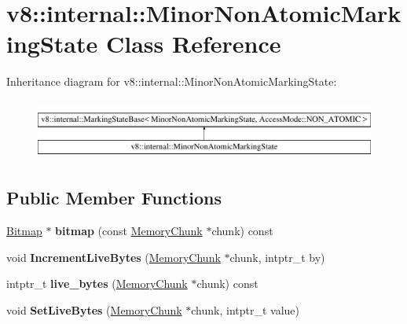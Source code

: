 \hypertarget{classv8_1_1internal_1_1MinorNonAtomicMarkingState}{}\section{v8\+:\+:internal\+:\+:Minor\+Non\+Atomic\+Marking\+State Class Reference}
\label{classv8_1_1internal_1_1MinorNonAtomicMarkingState}
Inheritance diagram for v8\+:\+:internal\+:\+:Minor\+Non\+Atomic\+Marking\+State\+:\begin{figure}[H]
\begin{center}
\leavevmode
\includegraphics[height=2.000000cm]{classv8_1_1internal_1_1MinorNonAtomicMarkingState}
\end{center}
\end{figure}
\subsection*{Public Member Functions}
\begin{DoxyCompactItemize}
\item 
\mbox{\label{classv8_1_1internal_1_1MinorNonAtomicMarkingState_a1bb1efe2d3ed6233a93acd6df97930c3}} 
\mbox{\hyperlink{classv8_1_1internal_1_1Bitmap}{Bitmap}} $\ast$ {\bfseries bitmap} (const \mbox{\hyperlink{classv8_1_1internal_1_1MemoryChunk}{Memory\+Chunk}} $\ast$chunk) const
\item 
\mbox{\label{classv8_1_1internal_1_1MinorNonAtomicMarkingState_a4cf8ce75300e147454fba2eb27946e76}} 
void {\bfseries Increment\+Live\+Bytes} (\mbox{\hyperlink{classv8_1_1internal_1_1MemoryChunk}{Memory\+Chunk}} $\ast$chunk, intptr\+\_\+t by)
\item 
\mbox{\label{classv8_1_1internal_1_1MinorNonAtomicMarkingState_ab57d990cf4b186acd8353db05ed80014}} 
intptr\+\_\+t {\bfseries live\+\_\+bytes} (\mbox{\hyperlink{classv8_1_1internal_1_1MemoryChunk}{Memory\+Chunk}} $\ast$chunk) const
\item 
\mbox{\label{classv8_1_1internal_1_1MinorNonAtomicMarkingState_ac7908ae183553d52e6d44a6eaa8cf65f}} 
void {\bfseries Set\+Live\+Bytes} (\mbox{\hyperlink{classv8_1_1internal_1_1MemoryChunk}{Memory\+Chunk}} $\ast$chunk, intptr\+\_\+t value)
\end{DoxyCompactItemize}


